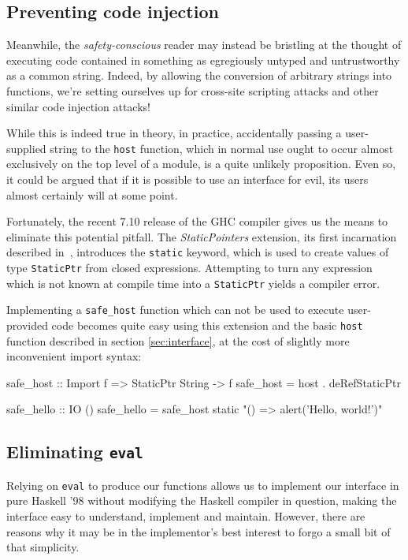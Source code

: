 \documentclass[preprint]{sigplanconf}
\begin{document}
\subsection{Preventing code injection}
\label{sec:safe_host}
Meanwhile, the \emph{safety-conscious} reader may instead be bristling at the
thought of executing code contained in something as egregiously untyped and
untrustworthy as a common string.
Indeed, by allowing the conversion of arbitrary strings
into functions, we're setting ourselves up for cross-site scripting attacks
and other similar code injection attacks!

While this is indeed true in theory, in practice, accidentally passing a
user-supplied string to the \lstinline!host! function, which in normal use
ought to occur almost exclusively on the top level of a module, is a quite
unlikely proposition. Even so, it could be argued that if it is possible to use
an interface for evil, its users almost certainly will at some point.

Fortunately, the recent 7.10 release of the GHC compiler gives us the means to
eliminate this potential pitfall. The \emph{StaticPointers} extension, its
first incarnation described in\ \cite{cloudhaskell}, introduces the
\lstinline!static! keyword, which is used to create values of type
\lstinline!StaticPtr! from closed expressions. Attempting to turn any
expression which is not known at compile time into a \lstinline!StaticPtr!
yields a compiler error.

Implementing a \lstinline!safe_host! function which can not be used
to execute user-provided code becomes quite easy using
this extension and the basic \lstinline!host! function described in section
\ref{sec:interface}, at the cost of slightly more inconvenient import syntax:

\begin{code}
  safe_host :: Import f => StaticPtr String -> f
  safe_host = host . deRefStaticPtr

  safe_hello :: IO ()
  safe_hello = safe_host
    static "() => alert('Hello, world!')"
\end{code}

\subsection{Eliminating \lstinline!eval!}
\label{sec:inline-eval}
Relying on \lstinline!eval! to produce our functions allows us to
implement our interface in pure Haskell '98 without modifying the Haskell
compiler in question, making the interface easy to understand, implement and
maintain. However, there are reasons why it may be in the implementor's best
interest to forgo a small bit of that simplicity.
\end{document}
